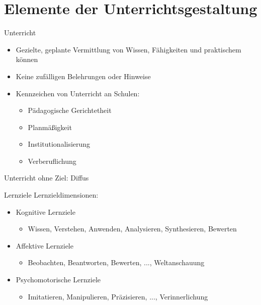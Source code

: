 \documentclass{article}
\begin{document}
\section{Elemente der Unterrichtsgestaltung}
\begin{block}{Unterricht}
    \begin{itemize}
        \item Gezielte, geplante Vermittlung von Wissen, Fähigkeiten und praktischem können
        \item Keine zufälligen Belehrungen oder Hinweise
        \item Kennzeichen von Unterricht an Schulen:
        \begin{itemize}
            \item Pädagogische Gerichtetheit
            \item Planmäßigkeit
            \item Institutionalisierung
            \item Verberuflichung
        \end{itemize}
    \end{itemize}
\end{block}

Unterricht ohne Ziel: Diffus

\begin{block}{Lernziele}
    Lernzieldimensionen:
    \begin{itemize}
        \item Kognitive Lernziele
        \begin{itemize}
            \item Wissen, Verstehen, Anwenden, Analysieren, Synthesieren, Bewerten
        \end{itemize}
        \item Affektive Lernziele
        \begin{itemize}
            \item Beobachten, Beantworten, Bewerten, ..., Weltanschauung
        \end{itemize}
        \item Psychomotorische Lernziele
        \begin{itemize}
            \item Imitatieren, Manipulieren, Präzisieren, ..., Verinnerlichung
        \end{itemize}
    \end{itemize}
\end{block}
\end{document}
